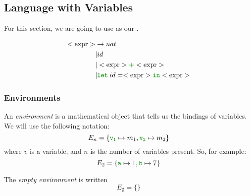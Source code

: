 \subsection{Language with Variables}\label{subsec:Language_with_Variables}
For this section, we are going to use  as our .
\begin{blackbox}
  \begin{equation}\label{eq:LetAdd_Grammar}
    \begin{aligned}
      \Nonterminal{expr} &\rightarrow nat \\
      &\vert id \\
      &\vert \Nonterminal{expr} \textcolor{Green4}{\mathtt{+}} \Nonterminal{expr} \\
      &\vert \textcolor{Green4}{\mathtt{let}}\: id = \Nonterminal{expr} \textcolor{Green4}{\mathtt{in}} \Nonterminal{expr} \\
    \end{aligned}
  \end{equation}
\end{blackbox}

\subsubsection{Environments}\label{subsubsec:Semantic_Environments}
\begin{definition}[Environment]\label{def:Semantic_Environment}
  An \emph{environment} is a mathematical object that tells us the bindings of variables.
  We will use the following notation:
  \begin{equation}\label{eq:Environment}
    E_{n} = \lbrace \textcolor{Green4}{\mathtt{v_{1}}} \mapsto m_{1}, \textcolor{Green4}{\mathtt{v_{2}}} \mapsto m_{2} \rbrace
  \end{equation}
  where $v$ is a variable, and $n$ is the number of variables present.
  So, for example:
  \begin{equation*}
    E_{2} = \lbrace \textcolor{Green4}{\mathtt{a}} \mapsto 1, \textcolor{Green4}{\mathtt{b}} \mapsto 7 \rbrace
  \end{equation*}

  \begin{remark}\label{rmk:Empty_Environment}
    The \emph{empty environment} is written
    \begin{equation}\label{eq:Empty_Environment}
      E_{\emptyset} = \lbrace \rbrace
    \end{equation}
  \end{remark}
\end{definition}

